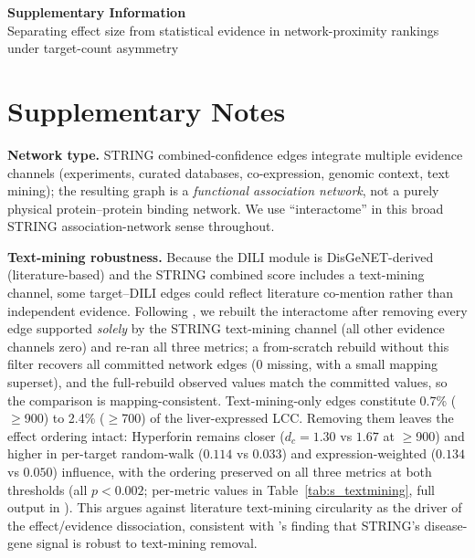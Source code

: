 \clearpage
\begin{center}
{\Large\textbf{Supplementary Information}}\\[1em]
{\large Separating effect size from statistical evidence in network-proximity rankings under target-count asymmetry}\\[1em]
\suppauthor
\end{center}
\vspace{1.5em}

\setcounter{table}{0}
\renewcommand{\thetable}{S\arabic{table}}
\setcounter{figure}{0}
\renewcommand{\thefigure}{S\arabic{figure}}

\section*{Supplementary Notes}

\textbf{Network type.} STRING combined-confidence edges integrate multiple evidence channels (experiments, curated databases, co-expression, genomic context, text mining); the resulting graph is a \textit{functional association network}, not a purely physical protein--protein binding network. We use ``interactome'' in this broad STRING association-network sense throughout.

\textbf{Text-mining robustness.} Because the DILI module is DisGeNET-derived (literature-based) and the STRING combined score includes a text-mining channel, some target--DILI edges could reflect literature co-mention rather than independent evidence. Following \citet{Huang2018}, we rebuilt the interactome after removing every edge supported \textit{solely} by the STRING text-mining channel (all other evidence channels zero) and re-ran all three metrics; a from-scratch rebuild without this filter recovers all committed network edges (0 missing, with a small mapping superset), and the full-rebuild observed values match the committed values, so the comparison is mapping-consistent. Text-mining-only edges constitute 0.7\% ($\geq$900) to 2.4\% ($\geq$700) of the liver-expressed LCC. Removing them leaves the effect ordering intact: Hyperforin remains closer ($d_c=1.30$ vs $1.67$ at $\geq$900) and higher in per-target random-walk ($0.114$ vs $0.033$) and expression-weighted ($0.134$ vs $0.050$) influence, with the ordering preserved on all three metrics at both thresholds (all $p<0.002$; per-metric values in Table~\ref{tab:s_textmining}, full output in ). This argues against literature text-mining circularity as the driver of the effect/evidence dissociation, consistent with \citeauthor{Huang2018}'s finding that STRING's disease-gene signal is robust to text-mining removal.

